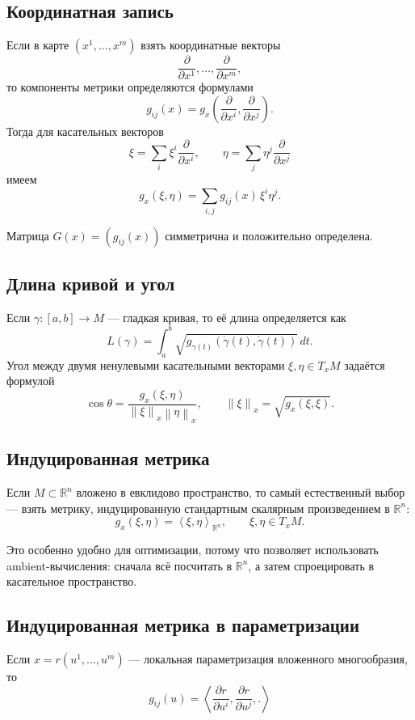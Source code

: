 \documentclass[12pt,a4paper]{article}
\theoremstyle{rudef}
\theoremstyle{ruplain}
\newcommand{\R}{\mathbb{R}}
\newcommand{\ip}[2]{\left\langle #1,#2\right\rangle}
\newcommand{\norm}[1]{\left\lVert #1\right\rVert}
\begin{document}
\subsection{Координатная запись}

Если в карте $(x^1,\dots,x^m)$ взять координатные векторы
\[
\frac{\partial}{\partial x^1},\dots,\frac{\partial}{\partial x^m},
\]
то компоненты метрики определяются формулами
\[
g_{ij}(x)=g_x\!\left(\frac{\partial}{\partial x^i},\frac{\partial}{\partial x^j}\right).
\]
Тогда для касательных векторов
\[
\xi=\sum_i \xi^i \frac{\partial}{\partial x^i},
\qquad
\eta=\sum_j \eta^j \frac{\partial}{\partial x^j}
\]
имеем
\[
g_x(\xi,\eta)=\sum_{i,j} g_{ij}(x)\,\xi^i\eta^j.
\]

Матрица $G(x)=(g_{ij}(x))$ симметрична и положительно определена.

\subsection{Длина кривой и угол}

Если $\gamma:[a,b]\to M$ --- гладкая кривая, то её длина определяется как
\[
L(\gamma)=\int_a^b \sqrt{g_{\gamma(t)}(\dot\gamma(t),\dot\gamma(t))}\,dt.
\]
Угол между двумя ненулевыми касательными векторами $\xi,\eta\in T_xM$ задаётся формулой
\[
\cos\theta = \frac{g_x(\xi,\eta)}{\norm{\xi}_x\norm{\eta}_x},
\qquad
\norm{\xi}_x=\sqrt{g_x(\xi,\xi)}.
\]

\subsection{Индуцированная метрика}

Если $M\subset \R^n$ вложено в евклидово пространство, то самый естественный выбор --- взять метрику, индуцированную стандартным скалярным произведением в $\R^n$:
\[
g_x(\xi,\eta)=\ip{\xi}{\eta}_{\R^n},
\qquad \xi,\eta\in T_xM.
\]

Это особенно удобно для оптимизации, потому что позволяет использовать ambient-вычисления: сначала всё посчитать в $\R^n$, а затем спроецировать в касательное пространство.

\subsection{Индуцированная метрика в параметризации}

Если $x=r(u^1,\dots,u^m)$ --- локальная параметризация вложенного многообразия, то
\[
g_{ij}(u)=\ip{\frac{\partial r}{\partial u^i},\frac{\partial r}{\partial u^j}}.
\]
\end{document}
